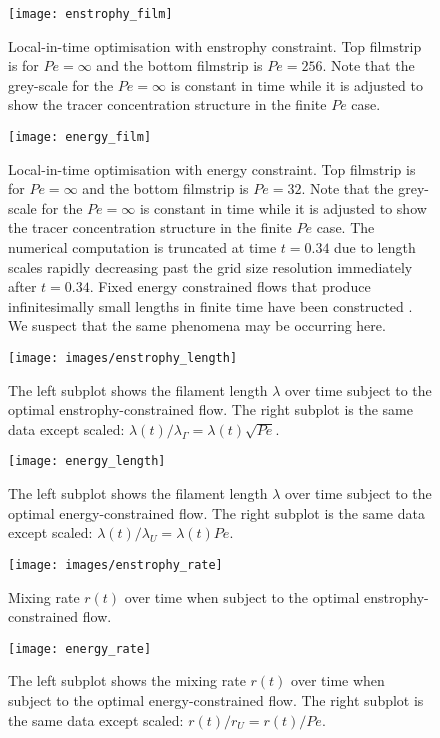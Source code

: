 \documentclass[12pt]{iopart}
\begin{document}
\begin{figure}
\texttt{[image: enstrophy\_film]}
\caption{Local-in-time optimisation with enstrophy constraint. Top filmstrip is for $Pe =\infty$ and the bottom filmstrip is $Pe=256$. Note that the grey-scale for the $Pe=\infty$ is constant in time while it is adjusted to show the tracer concentration structure in the finite $Pe$ case. }
\label{fig:enstrophy_film}
\end{figure}
%
\begin{figure}
\texttt{[image: energy\_film]}
\caption{Local-in-time optimisation with energy constraint. Top filmstrip is for $Pe = \infty$ and the bottom filmstrip is $Pe=32$. Note that the grey-scale for the $Pe=\infty$ is constant in time while it is adjusted to show the tracer concentration structure in the finite $Pe$ case. The numerical computation is truncated at time $t=0.34$ due to length scales rapidly decreasing past the grid size resolution immediately after $t=0.34$. Fixed energy constrained flows that produce infinitesimally small lengths in finite time have been constructed \cite{JMP2012}. We suspect that the same phenomena may be occurring here.}
\label{fig:energy_film}
\end{figure}
%
\begin{figure}
\texttt{[image: images/enstrophy\_length]}
\caption{The left subplot shows the filament length $\lambda$ over time subject to the optimal enstrophy-constrained flow. The right subplot is the same data except scaled: $\lambda(t)/\lambda_{\Gamma} = \lambda(t)\sqrt{Pe}$.}
\label{fig:enstrophy_length}
\end{figure}
%
\begin{figure}
\texttt{[image: energy\_length]}
\caption{The left subplot shows the filament length $\lambda$ over time subject to the optimal energy-constrained flow. The right subplot is the same data except scaled: $\lambda(t)/\lambda_{U} = \lambda(t) Pe$.}
\label{fig:energy_length}
\end{figure}
%
\begin{figure}
\centering
\texttt{[image: images/enstrophy\_rate]}
\caption{Mixing rate $r(t)$ over time when subject to the optimal enstrophy-constrained flow.}
\label{fig:enstrophy_rate}
\end{figure}
%
\begin{figure}
\centering
\texttt{[image: energy\_rate]}
\caption{The left subplot shows the mixing rate $r(t)$ over time when subject to the optimal energy-constrained flow. The right subplot is the same data except scaled: $r(t)/r_{U} = r(t)/Pe$.}
\label{fig:energy_rate}
\end{figure}
\end{document}
